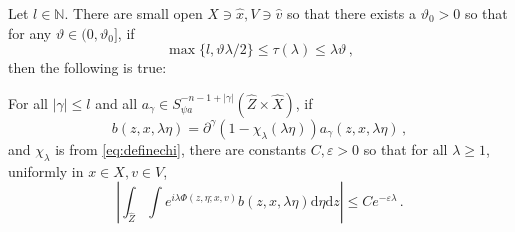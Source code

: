 \documentclass[
	fontsize=11pt, 
	twoside=false, 
	abstract=true, 
	a4paper,
]{scrartcl}
\newcommand{\eps}{\varepsilon}
\newcommand{\dd}{\mathrm{d}}
\newcommand{\abs}[1]{\left\lvert#1\right\rvert}
\newcommand{\del}{\partial}
\newcommand{\supp}{\mathrm{supp}}
\newcommand{\an}{\quad\text{and}\quad}
\begin{document}
\begin{lemma}\label{prop:K2decay2}
	Let $l\in\mathbb{N}$. There are small open $X \ni \hat x, V\ni \hat v$ so that there exists a $\vartheta_0 > 0$ so that for any $\vartheta \in (0,\vartheta_0]$, if %
	\begin{equation}\label{eq:tauK22}
		\max\{l,\vartheta\lambda/2\} \leq \tau(\lambda) \leq \lambda\vartheta\,,
	\end{equation}
	then the following is true:

	For all $\abs{\gamma} \leq l$ and all $a_\gamma \in S_{\psi a}^{-n-1+\abs{\gamma}}(\hat Z\times\hat X)$, if
	\[
		b(z,x,\lambda\eta) = \del^\gamma(1-\chi_\lambda(\lambda\eta))a_\gamma(z,x,\lambda\eta)\,,%
	\]
	and $\chi_\lambda$ is from \cref{eq:definechi},	there are constants $C,\eps>0$ so that for all $\lambda \geq 1$, uniformly in $x\in X, v \in V$, 
	\begin{equation}\label{eq:K2here22}
		\abs{\int_{\hat Z}\int e^{i\lambda\Phi(z,\eta;x,v)}b(z,x,\lambda\eta)\dd\eta\dd z} \leq Ce^{-\eps\lambda}\,.
	\end{equation}
\end{lemma}
\end{document}
